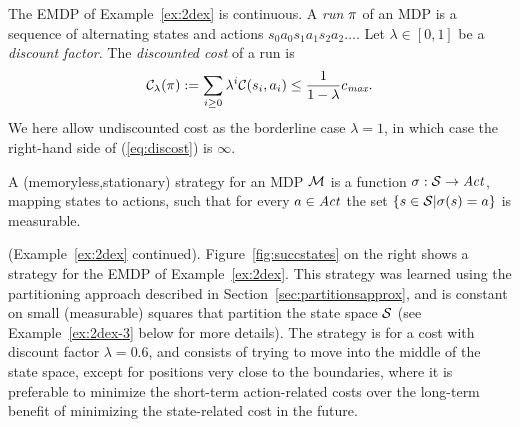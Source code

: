 \documentclass{llncs}
\begin{document}
The EMDP of Example~\ref{ex:2dex} is continuous. 
A \emph{run} $\pi$ of an MDP is a sequence of alternating states and actions
$s_0a_0s_1a_1s_2a_2\ldots$.
Let $\lambda \in [0,1]$ be a \emph{discount factor}. 
The \emph{discounted cost} of a run is
\begin{equation}
\label{eq:discost}
\mathcal{C}_{\lambda}(\pi) := \sum_{i \geq 0} \lambda^i\mathcal{C}(s_i,a_i) \leq \frac{1}{1-\lambda}c_{\emph{max}}.
\end{equation}
We here allow undiscounted cost as the borderline case $\lambda=1$, in which case the right-hand
side of (\ref{eq:discost}) is $\infty$.
 
  
\begin{definition}[Strategy]
  A (memoryless,stationary) strategy for an MDP $\mathcal{M}$ is a function
  $\sigma:\mathcal{S}\rightarrow\mathit{Act}$, mapping states to actions, such that for every $a\in\mathit{Act}$ the set
  $\{s\in\mathcal{S}| \sigma(s)=a\}$ is measurable.
\end{definition}

\begin{example}
\label{ex:2dex-2}
(Example~\ref{ex:2dex} continued).
Figure~\ref{fig:succstates} on the right shows a strategy for the EMDP of Example~\ref{ex:2dex}. This
strategy was learned using the partitioning approach described in Section~\ref{sec:partitionsapprox}, and is
constant on small (measurable) squares that partition the state space $\mathcal{S}$ (see Example~\ref{ex:2dex-3} below
for more details). The strategy is for a cost with discount factor $\lambda=0.6$, and
consists of trying to move into the middle of the state space, except for positions very close to the boundaries,
where it is preferable to minimize the short-term action-related costs over the long-term benefit of minimizing
the state-related cost in the future.
\end{example}
\end{document}
